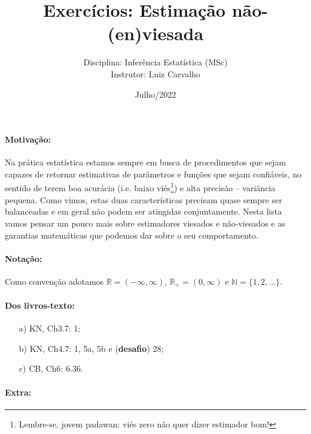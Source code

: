 \documentclass[a4paper,10pt, notitlepage]{report}
\title{Exercícios: Estimação não-(en)viesada}
\author{Disciplina: Inferência Estatística (MSc)  \\ Instrutor: Luiz Carvalho}
\date{Julho/2022}
\newcommand{\rpl}{\mathbb{R}_+}
\begin{document}
\maketitle

\paragraph{Motivação:} Na prática estatística estamos sempre em busca de procedimentos que sejam capazes de retornar estimativas de parâmetros e funções que sejam confiáveis, no sentido de terem boa acurácia (i.e. baixo viés\footnote{Lembre-se, jovem padawan: viés zero não quer dizer estimador bom!}) e alta precisão -- variância pequena.
Como vimos, estas duas características precisam quase sempre ser balanceadas e em geral não podem ser atingidas conjuntamente.
Nesta lista vamos pensar um pouco mais sobre estimadores viesados e não-viesados e as garantias matemáticas que podemos dar sobre o seu comportamento.

\paragraph{Notação:} Como convenção adotamos $\mathbb{R} = (-\infty, \infty)$, $\rpl = (0, \infty)$ e $\mathbb{N} = \{1, 2, \ldots \}$.

\paragraph{Dos livros-texto:}

\begin{itemize}
    \item[a)] KN, Ch3.7: 1;
    \item[b)] KN, Ch4.7: 1, 5a, 5b e (\textbf{desafio}) 28;
    \item[c)] CB, Ch6: 6.36.
\end{itemize}

\paragraph{Extra:}
\end{document}
